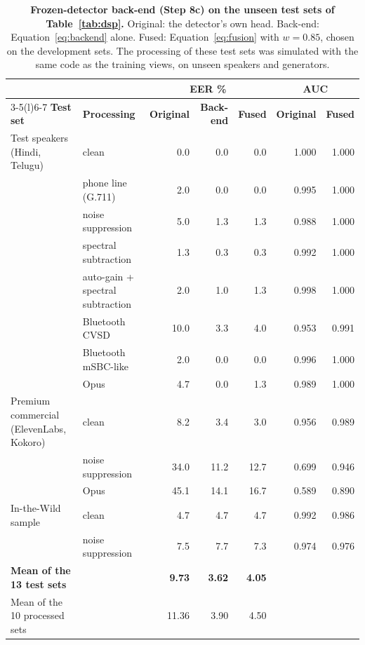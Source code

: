 \documentclass[10pt,a4paper,twocolumn]{article}
\begin{document}
\begin{table}[t]
\centering\small
\caption{\textbf{Frozen-detector back-end (Step 8c) on the unseen test sets of Table~\ref{tab:dsp}.} Original: the detector's own head. Back-end: Equation~\ref{eq:backend} alone. Fused: Equation~\ref{eq:fusion} with $w=0.85$, chosen on the development sets. The processing of these test sets was simulated with the same code as the training views, on unseen speakers and generators.}
\label{tab:backend}
\begin{tabular}{@{}llrrrrr@{}}
\toprule
 & & \multicolumn{3}{c}{\textbf{EER \%}} & \multicolumn{2}{c}{\textbf{AUC}}\\
\cmidrule(lr){3-5}\cmidrule(l){6-7}
\textbf{Test set} & \textbf{Processing} & \textbf{Original} & \textbf{Back-end} & \textbf{Fused} & \textbf{Original} & \textbf{Fused}\\
\midrule
Test speakers (Hindi, Telugu) & clean & 0.0 & 0.0 & 0.0 & 1.000 & 1.000\\
 & phone line (G.711) & 2.0 & 0.0 & 0.0 & 0.995 & 1.000\\
 & noise suppression & 5.0 & 1.3 & 1.3 & 0.988 & 1.000\\
 & spectral subtraction & 1.3 & 0.3 & 0.3 & 0.992 & 1.000\\
 & auto-gain + spectral subtraction & 2.0 & 1.0 & 1.3 & 0.998 & 1.000\\
 & Bluetooth CVSD & 10.0 & 3.3 & 4.0 & 0.953 & 0.991\\
 & Bluetooth mSBC-like & 2.0 & 0.0 & 0.0 & 0.996 & 1.000\\
 & Opus & 4.7 & 0.0 & 1.3 & 0.989 & 1.000\\
\midrule
Premium commercial (ElevenLabs, Kokoro) & clean & 8.2 & 3.4 & 3.0 & 0.956 & 0.989\\
 & noise suppression & 34.0 & 11.2 & 12.7 & 0.699 & 0.946\\
 & Opus & 45.1 & 14.1 & 16.7 & 0.589 & 0.890\\
\midrule
In-the-Wild sample & clean & 4.7 & 4.7 & 4.7 & 0.992 & 0.986\\
 & noise suppression & 7.5 & 7.7 & 7.3 & 0.974 & 0.976\\
\midrule
\textbf{Mean of the 13 test sets} & & \textbf{9.73} & \textbf{3.62} & \textbf{4.05} & & \\
Mean of the 10 processed sets & & 11.36 & 3.90 & 4.50 & & \\
\bottomrule
\end{tabular}
\end{table}
\end{document}
